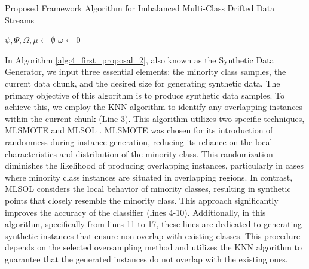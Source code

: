 \begin{algorithm}[H]
\caption{Proposed Framework Algorithm for Imbalanced Multi-Class Drifted Data Streams}
\BlankLine
$\psi, \Psi, \Omega, \mu \gets \emptyset$\;
$\omega \gets 0$\;
\end{algorithm}

\vspace{1cm}

In Algorithm \ref{alg:4_first_proposal_2}, also known as the Synthetic Data Generator, we input three essential elements: the minority class samples, the current data chunk, and the desired size for generating synthetic data. The primary objective of this algorithm is to produce synthetic data samples. To achieve this, we employ the KNN algorithm to identify any overlapping instances within the current chunk (Line 3). This algorithm utilizes two specific techniques, MLSMOTE \cite{gama2004learning} and MLSOL \cite{liu2017regional}. MLSMOTE was chosen for its introduction of randomness during instance generation, reducing its reliance on the local characteristics and distribution of the minority class. This randomization diminishes the likelihood of producing overlapping instances, particularly in cases where minority class instances are situated in overlapping regions. In contrast, MLSOL considers the local behavior of minority classes, resulting in synthetic points that closely resemble the minority class. This approach significantly improves the accuracy of the classifier (lines 4-10). Additionally, in this algorithm, specifically from lines 11 to 17, these lines are dedicated to generating synthetic instances that ensure non-overlap with existing classes. This procedure depends on the selected oversampling method and utilizes the KNN algorithm to guarantee that the generated instances do not overlap with the existing ones.
\vspace{1cm}

